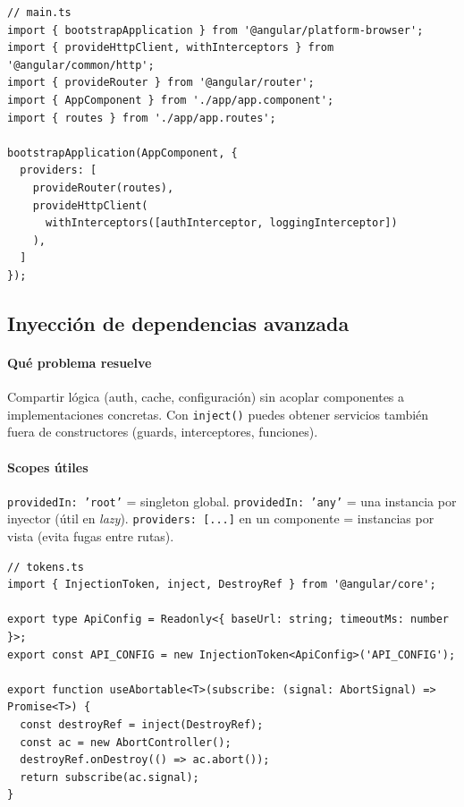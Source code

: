 \documentclass[11pt,a4paper]{article}
\begin{document}
\begin{lstlisting}[style=tsstyle, caption={Arranque con standalone y providers raíz}]
// main.ts
import { bootstrapApplication } from '@angular/platform-browser';
import { provideHttpClient, withInterceptors } from '@angular/common/http';
import { provideRouter } from '@angular/router';
import { AppComponent } from './app/app.component';
import { routes } from './app/app.routes';

bootstrapApplication(AppComponent, {
  providers: [
    provideRouter(routes),
    provideHttpClient(
      withInterceptors([authInterceptor, loggingInterceptor])
    ),
  ]
});
\end{lstlisting}

\subsection{Inyección de dependencias avanzada}
\paragraph{Qué problema resuelve}
Compartir lógica (auth, cache, configuración) sin acoplar componentes a implementaciones concretas. Con \texttt{inject()} puedes obtener servicios también fuera de constructores (guards, interceptores, funciones).

\paragraph{Scopes útiles}
\texttt{providedIn: 'root'} = singleton global. \texttt{providedIn: 'any'} = una instancia por inyector (útil en \emph{lazy}). \texttt{providers: [...]} en un componente = instancias por vista (evita fugas entre rutas).

\begin{lstlisting}[style=tsstyle, caption={Tokens, scopes y inject()}, label={lst:di}]
// tokens.ts
import { InjectionToken, inject, DestroyRef } from '@angular/core';

export type ApiConfig = Readonly<{ baseUrl: string; timeoutMs: number }>; 
export const API_CONFIG = new InjectionToken<ApiConfig>('API_CONFIG');

export function useAbortable<T>(subscribe: (signal: AbortSignal) => Promise<T>) {
  const destroyRef = inject(DestroyRef);
  const ac = new AbortController();
  destroyRef.onDestroy(() => ac.abort());
  return subscribe(ac.signal);
}
\end{lstlisting}
\end{document}
